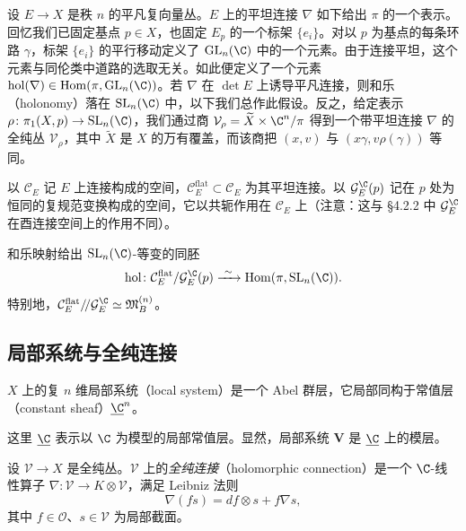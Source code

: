 设 $E\to X$ 是秩 $n$ 的平凡复向量丛。$E$ 上的平坦连接 $\nabla$ 如下给出 $\pi$ 的一个表示。回忆我们已固定基点 $p\in X$，也固定 $E_p$ 的一个标架 $\{e_i\}$。对以 $p$ 为基点的每条环路 $\gamma$，标架 $\{e_i\}$ 的平行移动定义了 $\mathrm{GL}_n(\C)$ 中的一个元素。由于连接平坦，这个元素与同伦类中道路的选取无关。如此便定义了一个元素 $\operatorname{hol}(\nabla)\in\operatorname{Hom}(\pi,\mathrm{GL}_n(\C))$。若 $\nabla$ 在 $\det E$ 上诱导平凡连接，则和乐（holonomy）落在 $\mathrm{SL}_n(\C)$ 中，以下我们总作此假设。反之，给定表示 $\rho\colon\pi_1(X,p)\to\mathrm{SL}_n(\C)$，我们通过商 $\mathcal{V}_\rho=\widetilde X\times\C^n/\pi$ 得到一个带平坦连接 $\nabla$ 的全纯丛 $\mathcal{V}_\rho$，其中 $\widetilde X$ 是 $X$ 的万有覆盖，而该商把 $(x,v)$ 与 $(x\gamma,v\rho(\gamma))$ 等同。

以 $\mathcal{C}_E$ 记 $E$ 上连接构成的空间，$\mathcal{C}_E^{\mathrm{flat}}\subset\mathcal{C}_E$ 为其平坦连接。以 $\mathcal{G}^\C_E(p)$ 记在 $p$ 处为恒同的复规范变换构成的空间，它以共轭作用在 $\mathcal{C}_E$ 上（注意：这与 §4.2.2 中 $\mathcal{G}^\C_E$ 在酉连接空间上的作用不同）。

\begin{proposition}
和乐映射给出 $\mathrm{SL}_n(\C)$-等变的同胚
\[
\operatorname{hol}\colon\mathcal{C}_E^{\mathrm{flat}}/\mathcal{G}^\C_E(p)
\xrightarrow{\ \sim\ }\operatorname{Hom}(\pi,\mathrm{SL}_n(\C)).
\]
特别地，$\mathcal{C}_E^{\mathrm{flat}}/\!/\mathcal{G}^\C_E\simeq\mathfrak{M}^{(n)}_B$。
\end{proposition}

\subsection{局部系统与全纯连接}

\begin{definition}
$X$ 上的复 $n$ 维局部系统（local system）是一个 Abel 群层，它局部同构于常值层（constant sheaf）$\underline{\C}^n$。
\end{definition}

这里 $\underline{\C}$ 表示以 $\C$ 为模型的局部常值层。显然，局部系统 $\mathbf{V}$ 是 $\underline{\C}$ 上的模层。

\begin{definition}
设 $\mathcal{V}\to X$ 是全纯丛。$\mathcal{V}$ 上的\emph{全纯连接}（holomorphic connection）是一个 $\C$-线性算子 $\nabla\colon\mathcal{V}\to K\otimes\mathcal{V}$，满足 Leibniz 法则
\begin{equation}
\nabla(fs)=df\otimes s+f\nabla s,
\label{eq:4.33}\tag{4.33}
\end{equation}
其中 $f\in\mathcal{O}$、$s\in\mathcal{V}$ 为局部截面。
\end{definition}

